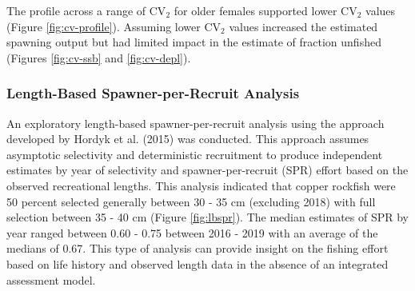\documentclass[11pt,
  english,
  a4paper,
]{article}
\begin{document}
\leavevmode\tagmcend\tagstructend\par


The profile across a range of {\(\text{CV}_2\)\leavevmode\tagmcend\tagstructend} for older females supported lower {\(\text{CV}_2\)\leavevmode\tagmcend\tagstructend} values (Figure \ref{fig:cv-profile}). Assuming lower {\(\text{CV}_2\)\leavevmode\tagmcend\tagstructend} values increased the estimated spawning output but had limited impact in the estimate of fraction unfished (Figures \ref{fig:cv-ssb} and \ref{fig:cv-depl}).

\leavevmode\tagmcend\tagstructend\par


\hypertarget{length-based-spawner-per-recruit-analysis}{%
\subsubsection{Length-Based Spawner-per-Recruit Analysis}\label{length-based-spawner-per-recruit-analysis}}

\leavevmode\tagmcend\tagstructend


An exploratory length-based spawner-per-recruit analysis using the approach developed by Hordyk et al. {(2015)\leavevmode\tagmcend\tagstructend} was conducted. This approach assumes asymptotic selectivity and deterministic recruitment to produce independent estimates by year of selectivity and spawner-per-recruit (SPR) effort based on the observed recreational lengths. This analysis indicated that copper rockfish were 50 percent selected generally between 30 - 35 cm (excluding 2018) with full selection between 35 - 40 cm (Figure \ref{fig:lbspr}). The median estimates of SPR by year ranged between 0.60 - 0.75 between 2016 - 2019 with an average of the medians of 0.67. This type of analysis can provide insight on the fishing effort based on life history and observed length data in the absence of an integrated assessment model.

\leavevmode\tagmcend\tagstructend\par
\end{document}
